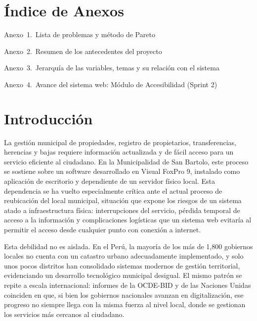 \documentclass[12pt,a4paper]{report}
\begin{document}
\chapter*{Índice de Anexos}
{\singlespacing
\noindent Anexo~1.~Lista de problemas y método de Pareto \dotfill~\pageref{anx:pareto}\par
\noindent Anexo~2.~Resumen de los antecedentes del proyecto \dotfill~\pageref{anx:antecedentes}\par
\noindent Anexo~3.~Jerarquía de las variables, temas y su relación con el sistema \dotfill~\pageref{anx:jerarquia}\par
\noindent Anexo~4.~Avance del sistema web: Módulo de Accesibilidad (Sprint 2) \dotfill~\pageref{anx:accesibilidad}\par}
\clearpage

\chapter*{Introducción}

La gestión municipal de propiedades, registro de propietarios, transferencias, herencias y bajas requiere información actualizada y de fácil acceso para un servicio eficiente al ciudadano. En la Municipalidad de San Bartolo, este proceso se sostiene sobre un software desarrollado en Visual FoxPro 9, instalado como aplicación de escritorio y dependiente de un servidor físico local. Esta dependencia se ha vuelto especialmente crítica ante el actual proceso de reubicación del local municipal, situación que expone los riesgos de un sistema atado a infraestructura física: interrupciones del servicio, pérdida temporal de acceso a la información y complicaciones logísticas que un sistema web evitaría al permitir el acceso desde cualquier punto con conexión a internet.

Esta debilidad no es aislada. En el Perú, la mayoría de los más de 1,800 gobiernos locales no cuenta con un catastro urbano adecuadamente implementado, y solo unos pocos distritos han consolidado sistemas modernos de gestión territorial, evidenciando un desarrollo tecnológico municipal desigual. El mismo patrón se repite a escala internacional: informes de la OCDE-BID y de las Naciones Unidas coinciden en que, si bien los gobiernos nacionales avanzan en digitalización, ese progreso no siempre llega con la misma fuerza al nivel local, donde se gestionan los servicios más cercanos al ciudadano.
\end{document}
